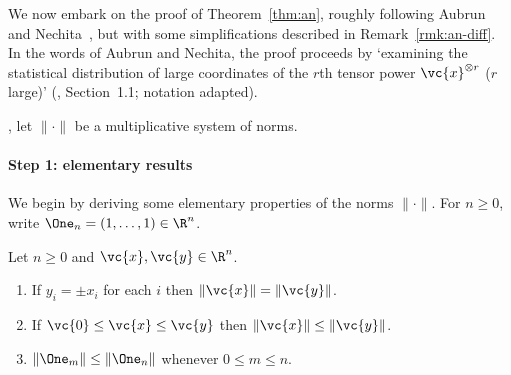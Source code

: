 We now embark on the proof of Theorem~\ref{thm:an}, roughly following
Aubrun and Nechita~\cite{AuNe}, but with some simplifications described in
Remark~\ref{rmk:an-diff}.  In the words of Aubrun and Nechita, the proof
proceeds by%
% 
%
% 
`examining the statistical distribution of large coordinates of the $r$th
tensor power $\vc{x}^{\otimes r}$ ($r$ large)' (\cite{AuNe}, Section~1.1;
notation adapted).   

, let $\|\cdot\|$ be a multiplicative
system of norms.

\paragraph*{Step 1: elementary results}
We begin by deriving some elementary properties of the norms $\|\cdot\|$.
For $n \geq 0$, write $\One_n = (1, \ldots, 1) \in \R^n$.

\begin{lemma}
Let $n \geq 0$ and $\vc{x}, \vc{y} \in \R^n$.
% 
\begin{enumerate}
\item 
{}
If $y_i = \pm x_i$ for each $i$ then $\|\vc{x}\| = \|\vc{y}\|$.

\item
{}
If $\vc{0} \leq \vc{x} \leq \vc{y}$ then $\|\vc{x}\| \leq \|\vc{y}\|$.

\item
{}
$\|\One_m\| \leq \|\One_n\|$ whenever $0 \leq m \leq n$.
\end{enumerate}
\end{lemma}

